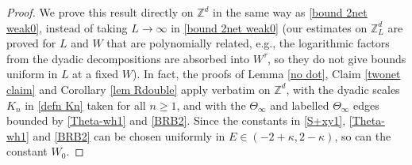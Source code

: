 \documentclass{article}
\newcommand{\1}{\mathds{1}}
\numberwithin{equation}{section}
\newcommand{\wt}{\widetilde}
\renewcommand{\leq}{\leqslant}
\renewcommand{\geq}{\geqslant}
\renewcommand{\le}{\leq}
\renewcommand{\ge}{\geq}
\newcommand{\Z}{\mathbb{Z}}
\newcommand{\dashed}{\text{diffusive}}
\theoremstyle{plain} %
\theoremstyle{remark}
\newcommand{\Sinfty}{\Sigma^{\infty}}
\newcommand{\wtSinfty}{\wt\Sigma^{\infty}}
\newcommand{\Sele}{{\mathcal E}}
\newcommand{\Selek}{{\mathcal E}}
\newcommand{\Seleinf}{{\mathcal E}^{\infty}}
\newcommand{\Cele}{{\mathscr E}}
\begin{document}
 \begin{proof}
We prove this result directly on $\Z^d$ in the same way as \eqref{bound 2net weak0}, instead of taking $L\to \infty$ in \eqref{bound 2net weak0} (our estimates on $\Z_L^d$ are proved for $L$ and $W$ that are polynomially related, e.g., the logarithmic factors from the dyadic decompositions are absorbed into $W^\tau$, so they do not give bounds uniform in $L$ at a fixed $W$). In fact, the proofs of Lemma \ref{no dot}, Claim \ref{twonet claim} and Corollary \ref{lem Rdouble} apply verbatim on $\Z^d$, with the dyadic scales $K_n$ in \eqref{defn Kn} taken for all $n\ge 1$, and with the $\Theta_\infty$ and labelled $\Theta_\infty$ edges bounded by \eqref{Theta-wh1} and \eqref{BRB2}. Since the constants in \eqref{S+xy1}, \eqref{Theta-wh1} and \eqref{BRB2} can be chosen uniformly in $E\in (-2+\kappa,2-\kappa)$, so can the constant $W_0$. %
 \end{proof}
 
\end{document}
